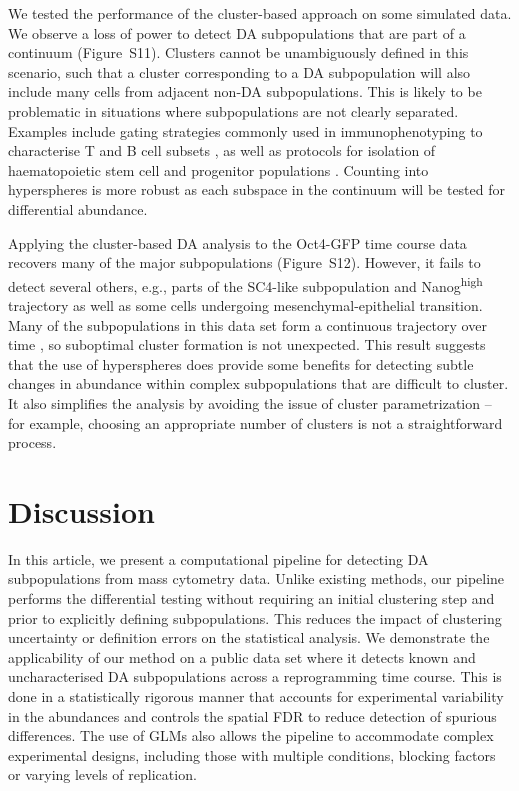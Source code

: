 \documentclass{article}
\newcommand{\suppfigclustersim}{S11}
\newcommand{\suppfigclusterreal}{S12}
\begin{document}
We tested the performance of the cluster-based approach on some simulated data.
We observe a loss of power to detect DA subpopulations that are part of a continuum (Figure~\suppfigclustersim{}).
Clusters cannot be unambiguously defined in this scenario, such that a cluster corresponding to a DA subpopulation will also include many cells from adjacent non-DA subpopulations.
This is likely to be problematic in situations where subpopulations are not clearly separated.
Examples include gating strategies commonly used in immunophenotyping to characterise T and B cell subsets \cite{finak2016standardizing}, as well as protocols for isolation of haematopoietic stem cell and progenitor populations \cite{wilson2015combined}.
Counting into hyperspheres is more robust as each subspace in the continuum will be tested for differential abundance.

Applying the cluster-based DA analysis to the Oct4-GFP time course data recovers many of the major subpopulations (Figure~\suppfigclusterreal{}).
However, it fails to detect several others, e.g., parts of the SC4-like subpopulation and Nanog\textsuperscript{high} trajectory as well as some cells undergoing mesenchymal-epithelial transition.
Many of the subpopulations in this data set form a continuous trajectory over time \cite{zunder2015continuous}, so suboptimal cluster formation is not unexpected.
This result suggests that the use of hyperspheres does provide some benefits for detecting subtle changes in abundance within complex subpopulations that are difficult to cluster.
It also simplifies the analysis by avoiding the issue of cluster parametrization -- for example, choosing an appropriate number of clusters is not a straightforward process.

\section{Discussion}
In this article, we present a computational pipeline for detecting DA subpopulations from mass cytometry data.
Unlike existing methods, our pipeline performs the differential testing without requiring an initial clustering step and prior to explicitly defining subpopulations.
This reduces the impact of clustering uncertainty or definition errors on the statistical analysis.
We demonstrate the applicability of our method on a public data set where it detects known and uncharacterised DA subpopulations across a reprogramming time course.
This is done in a statistically rigorous manner that accounts for experimental variability in the abundances and controls the spatial FDR to reduce detection of spurious differences.
The use of GLMs also allows the pipeline to accommodate complex experimental designs, including those with multiple conditions, blocking factors or varying levels of replication.
\end{document}
